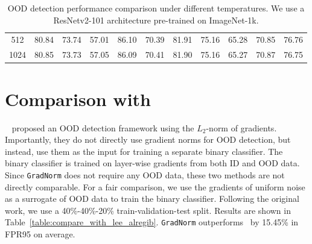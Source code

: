 \documentclass{article}
\begin{document}
\begin{table}[h]
{\begin{tabular}{c|C{0.04\textwidth}C{0.05\textwidth}|C{0.04\textwidth}C{0.05\textwidth}|C{0.04\textwidth}C{0.05\textwidth}|C{0.04\textwidth}C{0.05\textwidth}|C{0.04\textwidth}C{0.05\textwidth}}
512                                   & 80.84                & 73.74                 & 57.01                & 86.10                 & 70.39                & 81.91                 & 75.16                & 65.28                 & 70.85                & 76.76                \\
1024                                  & 80.85                & 73.73                 & 57.05                & 86.09                 & 70.41                & 81.90                 & 75.16                & 65.27                 & 70.87                & 76.75                \\ \bottomrule
\end{tabular}
}
    \caption{OOD detection performance comparison under different temperatures. We use a ResNetv2-101 architecture pre-trained on ImageNet-1k.}
    \label{tab:more_temper}
\end{table}

\section{Comparison with \citeauthor{lee2020gradients}}
\label{app:comparison_with_la}

\citeauthor{lee2020gradients}~\cite{lee2020gradients} proposed an OOD detection framework using the $L_2$-norm of gradients. Importantly, they do not directly use gradient norms for OOD detection, but instead, use them as the input for training a separate binary classifier. The binary classifier is trained on layer-wise gradients from both ID and OOD data. Since \texttt{GradNorm} does not require any OOD data, these two methods are not directly comparable. For a fair comparison, we use the gradients of uniform noise as a surrogate of OOD data to train the binary classifier. Following the original work, we use a 40\%-40\%-20\% train-validation-test split. 
Results are shown in Table~\ref{table:compare_with_lee_alregib}. \texttt{GradNorm} outperforms~\cite{lee2020gradients} by 15.45\% in FPR95 on average.
\end{document}
